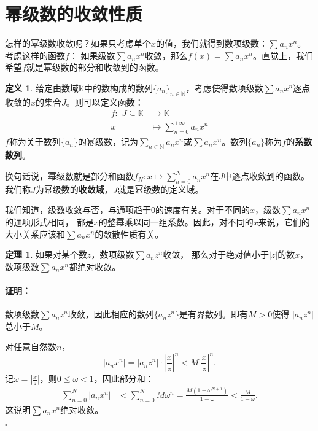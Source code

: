 \documentclass[12pt,UTF8]{ctexbook}
\theoremstyle{definition}
\newtheorem{df}{定义}[section]
\newtheorem{tm}{定理}[section]
\theoremstyle{plain}
\renewenvironment{proof}{\paragraph{\textbf{证明：}}}{\hfill$\square$}
\begin{document}
\section{幂级数的收敛性质}

怎样的幂级数收敛呢？如果只考虑单个$x$的值，我们就得到数项级数：$\sum a_n x^n$。考虑这样的函数$f$：
如果级数$\sum a_n x^n$收敛，那么$f(x) = \sum a_n x^n$。直觉上，我们希望$f$就是幂级数的部分和收敛到的函数。

\begin{df}
    给定由数域$\mathbb{K}$中的数构成的数列$\{a_n\}_{n\in\mathbb{N}}$，考虑使得数项级数$\sum a_n x^n$逐点收敛的$x$的集合$J$。则可以定义函数：
    $$
    \begin{array}{rl}
        f: \,\, J\subseteq \mathbb{K} &\rightarrow \mathbb{K} \\
        x &\displaystyle \mapsto \sum_{n=0}^{+\infty} a_n x^n        
    \end{array}
    $$
    $f$称为关于数列$\{a_n\}$的幂级数，记为$\sum_{n\in\mathbb{N}} a_n x^n$或$\sum a_n x^n$。数列$\{a_n\}$称为$f$的\textbf{系数数列}。
\end{df}
换句话说，幂级数就是部分和函数$f_N : x\mapsto \sum_{n=0}^{N} a_n x^n$在$J$中逐点收敛到的函数。
我们称$J$为幂级数的\textbf{收敛域}，$J$就是幂级数的定义域。

我们知道，级数收敛与否，与通项趋于$0$的速度有关。对于不同的$x$，级数$\sum a_n x^n$的通项形式相同，
都是$x$的整幂乘以同一组系数。因此，对不同的$x$来说，它们的大小关系应该和$\sum a_n x^n$的敛散性质有关。

\begin{tm}\label{tm:1-1-0}
    如果对某个数$z$，数项级数$\sum a_n z^n$收敛，
    那么对于绝对值小于$|z|$的数$x$，数项级数$\sum a_n x^n$都绝对收敛。
\end{tm}

\begin{proof}
    数项级数$\sum a_n z^n$收敛，因此相应的数列$\{a_n z^n\}$是有界数列。即有$M>0$使得
    $|a_n z^n|$总小于$M$。

    对任意自然数$n$，
    $$ |a_n x^n| = |a_n z^n| \cdot \left|\frac{x}{z}\right|^n < M \left|\frac{x}{z}\right|^n. $$
    记$\displaystyle \omega = \left|\frac{x}{z}\right|$，则$0\leqslant \omega<1$，因此部分和：
    \begin{align*}
        \sum_{n=0}^N |a_n x^n| &< \sum_{n=0}^N M \omega^n = \frac{M(1 - \omega^{N+1})}{1 - \omega} < \frac{M}{1 - \omega}.
    \end{align*}
    这说明$\sum a_n x^n$绝对收敛。

\end{proof}
\end{document}
